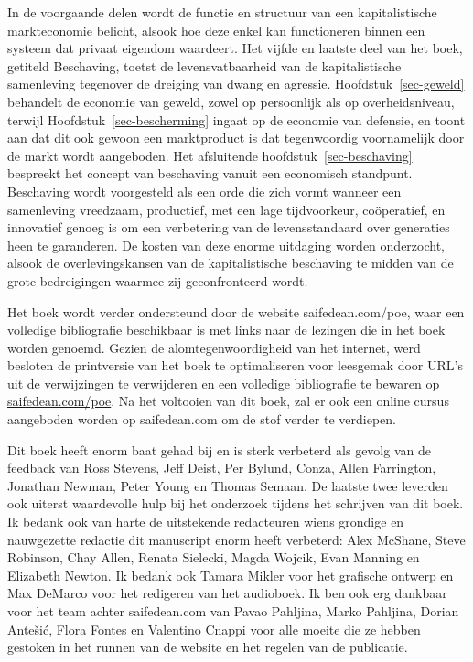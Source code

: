 \documentclass[
  a5paper,
  smalldemyvopaper,11pt,twoside,onecolumn,openright,extrafontsizes,
hidelinks]{memoir}
\begin{document}
In de voorgaande delen wordt de functie en structuur van een
kapitalistische markteconomie belicht, alsook hoe deze enkel kan
functioneren binnen een systeem dat privaat eigendom waardeert. Het
vijfde en laatste deel van het boek, getiteld
\textquotesingle Beschaving\textquotesingle, toetst de levensvatbaarheid
van de kapitalistische samenleving tegenover de dreiging van dwang en
agressie. Hoofdstuk~\ref{sec-geweld} behandelt de economie van geweld,
zowel op persoonlijk als op overheidsniveau, terwijl
Hoofdstuk~\ref{sec-bescherming} ingaat op de economie van defensie, en
toont aan dat dit ook gewoon een marktproduct is dat tegenwoordig
voornamelijk door de markt wordt aangeboden. Het afsluitende
hoofdstuk~\ref{sec-beschaving} bespreekt het concept van beschaving
vanuit een economisch standpunt. Beschaving wordt voorgesteld als een
orde die zich vormt wanneer een samenleving vreedzaam, productief, met
een lage tijdvoorkeur, coöperatief, en innovatief genoeg is om een
verbetering van de levensstandaard over generaties heen te garanderen.
De kosten van deze enorme uitdaging worden onderzocht, alsook de
overlevingskansen van de kapitalistische beschaving te midden van de
grote bedreigingen waarmee zij geconfronteerd wordt.

Het boek wordt verder ondersteund door de website saifedean.com/poe,
waar een volledige bibliografie beschikbaar is met links naar de
lezingen die in het boek worden genoemd. Gezien de alomtegenwoordigheid
van het internet, werd besloten de printversie van het boek te
optimaliseren voor leesgemak door URL's uit de verwijzingen te
verwijderen en een volledige bibliografie te bewaren op
\url{saifedean.com/poe}. Na het voltooien van dit boek, zal er ook een
online cursus aangeboden worden op saifedean.com om de stof verder te
verdiepen.

Dit boek heeft enorm baat gehad bij en is sterk verbeterd als gevolg van
de feedback van Ross Stevens, Jeff Deist, Per Bylund, Conza, Allen
Farrington, Jonathan Newman, Peter Young en Thomas Semaan. De laatste
twee leverden ook uiterst waardevolle hulp bij het onderzoek tijdens het
schrijven van dit boek. Ik bedank ook van harte de uitstekende
redacteuren wiens grondige en nauwgezette redactie dit manuscript enorm
heeft verbeterd: Alex McShane, Steve Robinson, Chay Allen, Renata
Sielecki, Magda Wojcik, Evan Manning en Elizabeth Newton. Ik bedank ook
Tamara Mikler voor het grafische ontwerp en Max DeMarco voor het
redigeren van het audioboek. Ik ben ook erg dankbaar voor het team
achter saifedean.com van Pavao Pahljina, Marko Pahljina, Dorian Antešić,
Flora Fontes en Valentino Cnappi voor alle moeite die ze hebben gestoken
in het runnen van de website en het regelen van de publicatie.
\end{document}
